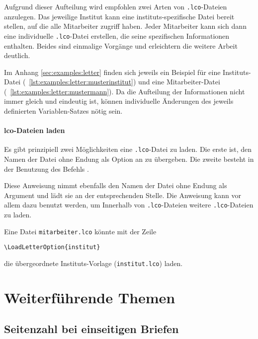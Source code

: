 Aufgrund dieser Aufteilung wird empfohlen zwei Arten von \texttt{.lco}-Dateien
anzulegen. Das jeweilige Institut kann eine instituts-spezifische Datei
bereit stellen, auf die alle Mitarbeiter zugriff haben. Jeder Mitarbeiter kann
sich dann eine individuelle \texttt{.lco}-Datei erstellen, die seine spezifischen
Informationen enthalten. Beides sind einmalige Vorgänge und erleichtern die
weitere Arbeit deutlich.

Im Anhang \ref{sec:examples:letter} finden sich jeweils ein Beispiel für eine
Instituts-Datei (\lstlistingname~\ref{lst:examples:letter:musterinstitut}) und eine Mitarbeiter-Datei
(\lstlistingname~\ref{lst:examples:letter:mustermann}). Da die Aufteilung der Informationen nicht immer 
gleich und eindeutig ist, können individuelle Änderungen des jeweils definierten
Variablen-Satzes nötig sein.

\paragraph{lco-Dateien laden}

Es gibt prinzipiell zwei Möglichkeiten eine \texttt{.lco}-Datei zu laden.
Die erste ist, den Namen der Datei ohne Endung als Option an
 zu übergeben.
Die zweite besteht in der Benutzung des Befehls .

\begin{Declaration}
\end{Declaration}

Diese Anweisung nimmt ebenfalls den Namen der Datei ohne Endung als
Argument und lädt sie an der entsprechenden Stelle.
Die Anweisung kann vor allem dazu benutzt werden, um Innerhalb von
\texttt{.lco}-Dateien weitere \texttt{.lco}-Dateien zu laden.

\begin{example}
  Eine Datei \lstinline{mitarbeiter.lco} könnte mit der Zeile
\begin{lstlisting}
\LoadLetterOption{institut}
\end{lstlisting}
  die übergeordnete Instituts-Vorlage (\lstinline{institut.lco}) laden.
\end{example}

\section{Weiterführende Themen}

\subsection{Seitenzahl bei einseitigen Briefen}

